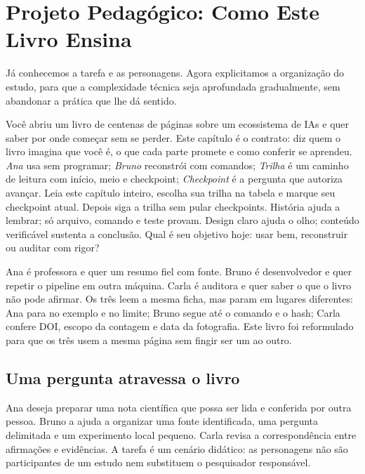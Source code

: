\chapter{Projeto Pedagógico: Como Este Livro Ensina}

Já conhecemos a tarefa e as personagens. Agora explicitamos a organização do estudo, para que a complexidade técnica seja aprofundada gradualmente, sem abandonar a prática que lhe dá sentido.


\roteirodidatico
{Você abriu um livro de centenas de páginas sobre um ecossistema de IAs e quer saber por onde começar sem se perder. Este capítulo é o contrato: diz quem o livro imagina que você é, o que cada parte promete e como conferir se aprendeu.}
{\emph{Ana} usa sem programar; \emph{Bruno} reconstrói com comandos; \emph{Trilha} é um caminho de leitura com início, meio e checkpoint; \emph{Checkpoint} é a pergunta que autoriza avançar.}
{Leia este capítulo inteiro, escolha sua trilha na tabela e marque seu checkpoint atual. Depois siga a trilha sem pular checkpoints.}
{História ajuda a lembrar; só arquivo, comando e teste provam. Design claro ajuda o olho; conteúdo verificável sustenta a conclusão.}
{Qual é seu objetivo hoje: usar bem, reconstruir ou auditar com rigor?}

{Ana é professora e quer um resumo fiel com fonte. Bruno é desenvolvedor e quer repetir o pipeline em outra máquina. Carla é auditora e quer saber o que o livro não pode afirmar. Os três leem a mesma ficha, mas param em lugares diferentes: Ana para no exemplo e no limite; Bruno segue até o comando e o hash; Carla confere DOI, escopo da contagem e data da fotografia. Este livro foi reformulado para que os três usem a mesma página sem fingir ser um ao outro.}

\section{Uma pergunta atravessa o livro}

Ana deseja preparar uma nota científica que possa ser lida e conferida por outra
pessoa. Bruno a ajuda a organizar uma fonte identificada, uma pergunta delimitada
e um experimento local pequeno. Carla revisa a correspondência entre afirmações
e evidências. A tarefa é um cenário didático: as personagens não são participantes
de um estudo nem substituem o pesquisador responsável.

